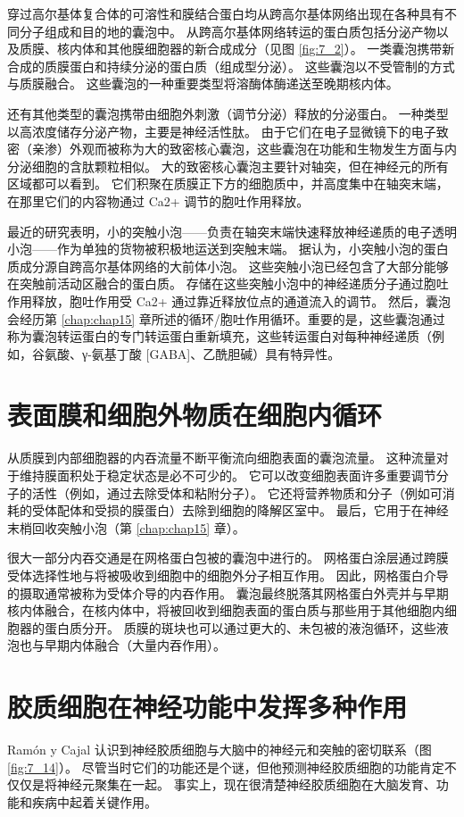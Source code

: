 穿过高尔基体复合体的可溶性和膜结合蛋白均从跨高尔基体网络出现在各种具有不同分子组成和目的地的囊泡中。 
从跨高尔基体网络转运的蛋白质包括分泌产物以及质膜、核内体和其他膜细胞器的新合成成分（见图 \ref{fig:7_2}）。 
一类囊泡携带新合成的质膜蛋白和持续分泌的蛋白质（组成型分泌）。 
这些囊泡以不受管制的方式与质膜融合。 
这些囊泡的一种重要类型将溶酶体酶递送至晚期核内体。


还有其他类型的囊泡携带由细胞外刺激（调节分泌）释放的分泌蛋白。 
一种类型以高浓度储存分泌产物，主要是神经活性肽。 
由于它们在电子显微镜下的电子致密（亲渗）外观而被称为大的致密核心囊泡，这些囊泡在功能和生物发生方面与内分泌细胞的含肽颗粒相似。 
大的致密核心囊泡主要针对轴突，但在神经元的所有区域都可以看到。 
它们积聚在质膜正下方的细胞质中，并高度集中在轴突末端，在那里它们的内容物通过 Ca2+ 调节的胞吐作用释放。


最近的研究表明，小的突触小泡——负责在轴突末端快速释放神经递质的电子透明小泡——作为单独的货物被积极地运送到突触末端。 
据认为，小突触小泡的蛋白质成分源自跨高尔基体网络的大前体小泡。 
这些突触小泡已经包含了大部分能够在突触前活动区融合的蛋白质。 
存储在这些突触小泡中的神经递质分子通过胞吐作用释放，胞吐作用受 Ca2+ 通过靠近释放位点的通道流入的调节。 
然后，囊泡会经历第 \ref{chap:chap15} 章所述的循环/胞吐作用循环。重要的是，这些囊泡通过称为囊泡转运蛋白的专门转运蛋白重新填充，这些转运蛋白对每种神经递质（例如，谷氨酸、γ-氨基丁酸 [GABA]、乙酰胆碱）具有特异性。


\section{表面膜和细胞外物质在细胞内循环}
从质膜到内部细胞器的内吞流量不断平衡流向细胞表面的囊泡流量。 
这种流量对于维持膜面积处于稳定状态是必不可少的。 
它可以改变细胞表面许多重要调节分子的活性（例如，通过去除受体和粘附分子）。 
它还将营养物质和分子（例如可消耗的受体配体和受损的膜蛋白）去除到细胞的降解区室中。 
最后，它用于在神经末梢回收突触小泡（第 \ref{chap:chap15} 章）。


很大一部分内吞交通是在网格蛋白包被的囊泡中进行的。 
网格蛋白涂层通过跨膜受体选择性地与将被吸收到细胞中的细胞外分子相互作用。 
因此，网格蛋白介导的摄取通常被称为受体介导的内吞作用。 
囊泡最终脱落其网格蛋白外壳并与早期核内体融合，在核内体中，将被回收到细胞表面的蛋白质与那些用于其他细胞内细胞器的蛋白质分开。 
质膜的斑块也可以通过更大的、未包被的液泡循环，这些液泡也与早期内体融合（大量内吞作用）。



\section{胶质细胞在神经功能中发挥多种作用}
Ramón y Cajal 认识到神经胶质细胞与大脑中的神经元和突触的密切联系（图 \ref{fig:7_14}）。 
尽管当时它们的功能还是个谜，但他预测神经胶质细胞的功能肯定不仅仅是将神经元聚集在一起。 
事实上，现在很清楚神经胶质细胞在大脑发育、功能和疾病中起着关键作用。

